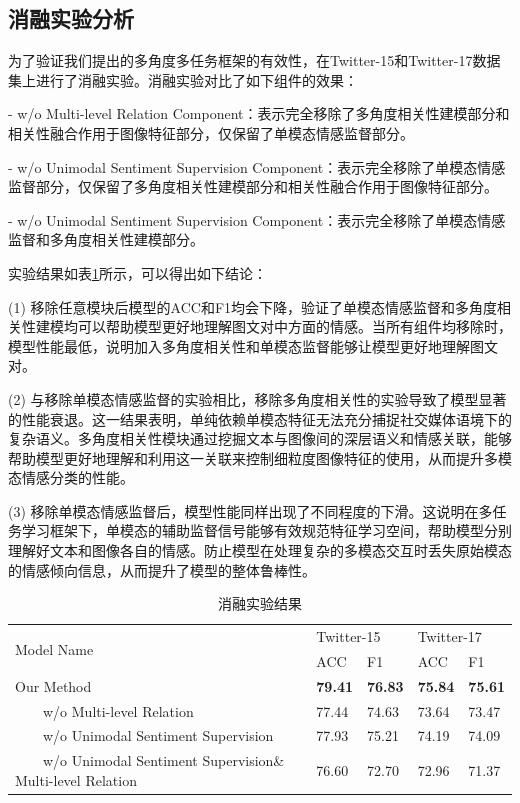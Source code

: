 \subsection{消融实验分析}
为了验证我们提出的多角度多任务框架的有效性，在Twitter-15和Twitter-17数据集上进行了消融实验。消融实验对比了如下组件的效果：

- w/o Multi-level Relation Component：表示完全移除了多角度相关性建模部分和相关性融合作用于图像特征部分，仅保留了单模态情感监督部分。

- w/o Unimodal Sentiment Supervision Component：表示完全移除了单模态情感监督部分，仅保留了多角度相关性建模部分和相关性融合作用于图像特征部分。

- w/o Unimodal Sentiment Supervision Component：表示完全移除了单模态情感监督和多角度相关性建模部分。

实验结果如表\ref{four:Ablation}所示，可以得出如下结论：

(1) 移除任意模块后模型的ACC和F1均会下降，验证了单模态情感监督和多角度相关性建模均可以帮助模型更好地理解图文对中方面的情感。当所有组件均移除时，模型性能最低，说明加入多角度相关性和单模态监督能够让模型更好地理解图文对。

(2) 与移除单模态情感监督的实验相比，移除多角度相关性的实验导致了模型显著的性能衰退。这一结果表明，单纯依赖单模态特征无法充分捕捉社交媒体语境下的复杂语义。多角度相关性模块通过挖掘文本与图像间的深层语义和情感关联，能够帮助模型更好地理解和利用这一关联来控制细粒度图像特征的使用，从而提升多模态情感分类的性能。

(3) 移除单模态情感监督后，模型性能同样出现了不同程度的下滑。这说明在多任务学习框架下，单模态的辅助监督信号能够有效规范特征学习空间，帮助模型分别理解好文本和图像各自的情感。防止模型在处理复杂的多模态交互时丢失原始模态的情感倾向信息，从而提升了模型的整体鲁棒性。
\begin{table}[t]
  \centering
    \caption{消融实验结果}
    \label{four:Ablation}
\begin{tabular}{lllll}
\toprule
\multirow{2}{*}{Model Name} & \multicolumn{2}{l}{Twitter-15} & \multicolumn{2}{l}{Twitter-17} \\
                            & ACC            & F1             & ACC             & F1            \\
    \hline
Our Method              & \textbf{79.41}       & \textbf{76.83}              & \textbf{75.84}                & \textbf{75.61}              \\
~~~~w/o Multi-level Relation  & 77.44		  &   74.63	       &     73.64	     &  73.47      \\
~~~~w/o Unimodal Sentiment Supervision  &77.93 & 		75.21	 	&74.19 	 	 & 	74.09  \\
~~~~w/o Unimodal Sentiment Supervision\& Multi-level Relation  & 76.60 &72.70& 72.96 &71.37 \\

\bottomrule
\end{tabular}
\end{table}

